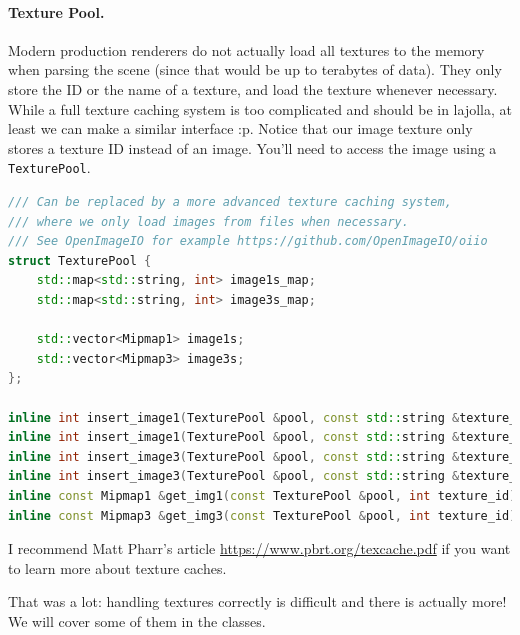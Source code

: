 \documentclass{article}
\begin{document}
\paragraph{Texture Pool.} Modern production renderers do not actually load all textures to the memory when parsing
the scene (since that would be up to terabytes of data). They only store the ID or the name of a texture, and load the texture whenever necessary. While a full texture caching system is too complicated and should be in lajolla, at least we can make a similar interface :p. Notice that our image texture only stores a texture ID instead of an image. You'll need to access the image using a \lstinline{TexturePool}.
\begin{lstlisting}[language=c++]
/// Can be replaced by a more advanced texture caching system,
/// where we only load images from files when necessary.
/// See OpenImageIO for example https://github.com/OpenImageIO/oiio
struct TexturePool {
    std::map<std::string, int> image1s_map;
    std::map<std::string, int> image3s_map;

    std::vector<Mipmap1> image1s;
    std::vector<Mipmap3> image3s;
};

inline int insert_image1(TexturePool &pool, const std::string &texture_name, const fs::path &filename);
inline int insert_image1(TexturePool &pool, const std::string &texture_name, const Image1 &img);
inline int insert_image3(TexturePool &pool, const std::string &texture_name, const fs::path &filename);
inline int insert_image3(TexturePool &pool, const std::string &texture_name, const Image3 &img);
inline const Mipmap1 &get_img1(const TexturePool &pool, int texture_id);
inline const Mipmap3 &get_img3(const TexturePool &pool, int texture_id);
\end{lstlisting}

I recommend Matt Pharr's article \href{The Implementation of a Scalable Texture Cache}{https://www.pbrt.org/texcache.pdf} if you want to learn more about texture caches.

That was a lot: handling textures correctly is difficult and there is actually more! We will cover some of them in the classes.
\end{document}
